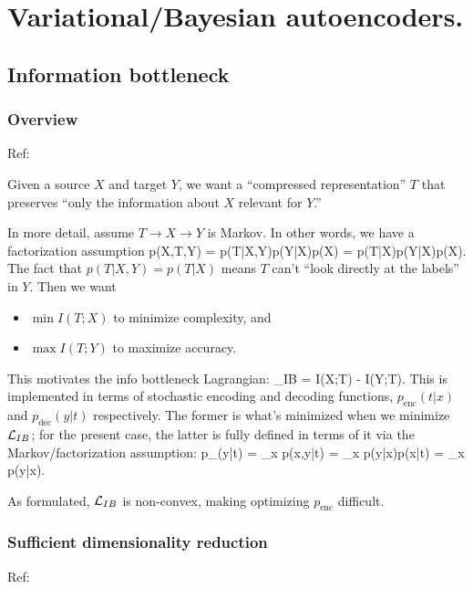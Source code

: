 \documentclass[notitlepage,openany,11pt]{report}
\numberwithin{equation}{section}
\theoremstyle{plain}%
\begin{document}
\chapter{Variational/Bayesian autoencoders.}

\section{Information bottleneck}

\subsection{Overview}
Ref: \cite{TishbyEtAl:99}

Given a source $X$ and target $Y$, we want a ``compressed representation'' $T$ that preserves ``only the information about $X$ relevant for $Y$.'' 

In more detail, assume $T \rightarrow X \rightarrow Y$ is Markov. In other words, we have a factorization assumption
\be
p(X,T,Y) = p(T|X,Y)p(Y|X)p(X) = p(T|X)p(Y|X)p(X).
\ee
The fact that $p(T|X,Y) = p(T|X)$ means $T$ can't ``look directly at the labels'' in $Y$. Then we want 
\begin{itemize}
\item $\min I(T;X)$ to minimize complexity, and
\item $\max I(T;Y)$ to maximize accuracy.
\end{itemize}
This motivates the info bottleneck Lagrangian:
\be
{}_{IB} = I(X;T) - \beta I(Y;T).
 This is implemented in terms of stochastic encoding and decoding functions, $p_{\text{enc}}(t|x)$ and $p_{\text{dec}}(y|t)$ respectively. The former is what's minimized when we minimize $\mcal{L}_{IB}$; for the present case, the latter is fully defined in terms of it via the Markov/factorization assumption:
\be
p_{}(y|t) = \sum_{x} p(x,y|t) = \sum_{x} p(y|x)p(x|t) = \sum_{x} p(y|x).
\ee

As formulated, $\mathcal{L}_{IB}$ is non-convex, making optimizing $p_{\text{enc}}$ difficult.


\subsection{Sufficient dimensionality reduction}
Ref: \cite{GlobersonTishby:03}
\end{document}
